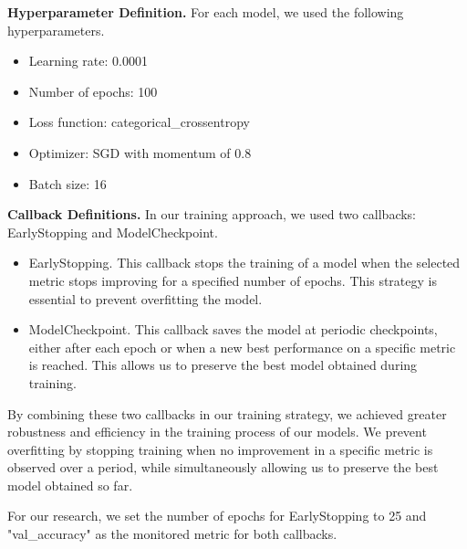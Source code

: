 \textbf{Hyperparameter Definition.} For each model, we used the following hyperparameters.

\begin{itemize}
	\item Learning rate: 0.0001
	\item Number of epochs: 100
	\item Loss function: categorical\_crossentropy
	\item Optimizer: SGD with momentum of 0.8
	\item Batch size: 16
\end{itemize}

\textbf{Callback Definitions.} In our training approach, we used two callbacks: EarlyStopping and ModelCheckpoint.

\begin{itemize}
	\item   EarlyStopping. 
	This callback stops the training of a model when the selected metric stops improving for a specified number of epochs. This strategy is essential to prevent overfitting the model.
	\item   ModelCheckpoint. 
	This callback saves the model at periodic checkpoints, either after each epoch or when a new best performance on a specific metric is reached. This allows us to preserve the best model obtained during training.
\end{itemize}

By combining these two callbacks in our training strategy, we achieved greater robustness and efficiency in the training process of our models. We prevent overfitting by stopping training when no improvement in a specific metric is observed over a period, while simultaneously allowing us to preserve the best model obtained so far.

For our research, we set the number of epochs for EarlyStopping to 25 and "val\_accuracy" as the monitored metric for both callbacks.

